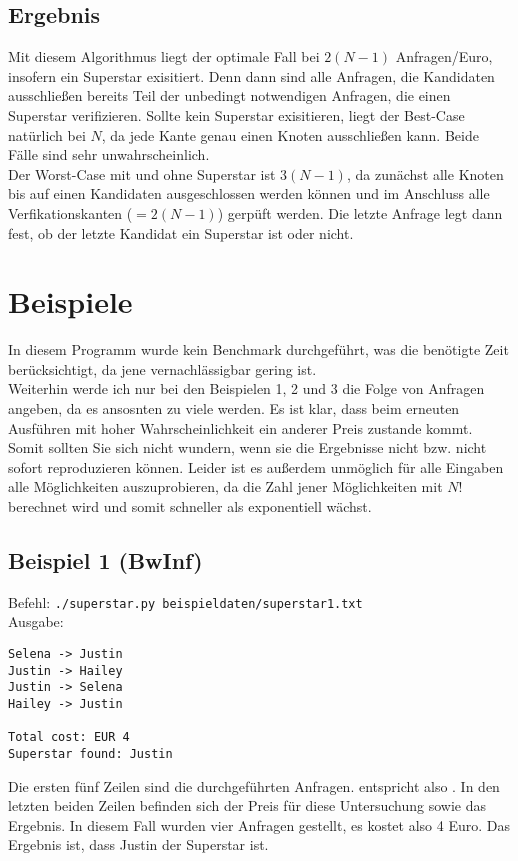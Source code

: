 \documentclass[a4paper,10pt,ngerman]{scrartcl}
\begin{document}
\subsection{Ergebnis}
Mit diesem Algorithmus liegt der optimale Fall bei $2(N-1)$ Anfragen/Euro, insofern 
ein Superstar exisitiert. Denn dann sind alle Anfragen, die Kandidaten ausschlie\ss en 
bereits Teil der unbedingt notwendigen Anfragen, die einen Superstar verifizieren. Sollte
kein Superstar exisitieren, liegt der Best-Case nat\"urlich bei $N$, da jede Kante genau
einen Knoten ausschlie\ss en kann. Beide F\"alle sind sehr unwahrscheinlich.\\
\indent Der Worst-Case mit und ohne Superstar ist $3(N-1)$, da zun\"achst alle Knoten bis
auf einen Kandidaten ausgeschlossen werden k\"onnen und im Anschluss alle Verfikationskanten
($=2(N-1)$) gerp\"uft werden. Die letzte Anfrage legt dann fest, ob der letzte Kandidat
ein Superstar ist oder nicht.
\section{Beispiele}
In diesem Programm wurde kein Benchmark durchgef\"uhrt, was die ben\"otigte Zeit
ber\"ucksichtigt, da jene vernachl\"assigbar gering ist.\\
\indent Weiterhin werde ich nur bei den Beispielen 1, 2 und 3 die Folge von Anfragen angeben, da
es ansosnten zu viele werden. Es ist klar, dass beim erneuten Ausf\"uhren mit hoher
Wahrscheinlichkeit ein anderer Preis zustande kommt. Somit sollten Sie sich nicht
wundern, wenn sie die Ergebnisse nicht bzw. nicht sofort reproduzieren k\"onnen. Leider
ist es au\ss erdem unm\"oglich f\"ur alle Eingaben alle M\"oglichkeiten auszuprobieren,
da die Zahl jener M\"oglichkeiten mit $N!$ berechnet wird und somit schneller als
exponentiell w\"achst.
\subsection{Beispiel 1 (BwInf)}
Befehl: \texttt{./superstar.py beispieldaten/superstar1.txt}\\
Ausgabe:
\begin{verbatim}
Selena -> Justin
Justin -> Hailey
Justin -> Selena
Hailey -> Justin

Total cost: EUR 4
Superstar found: Justin
\end{verbatim}
Die ersten f\"unf Zeilen sind die durchgef\"uhrten Anfragen. 
entspricht also .
In den letzten beiden Zeilen befinden sich der Preis f\"ur diese Untersuchung
sowie das Ergebnis. In diesem Fall wurden vier Anfragen gestellt, es kostet
also 4 Euro. Das Ergebnis ist, dass Justin der Superstar ist.
\end{document}
